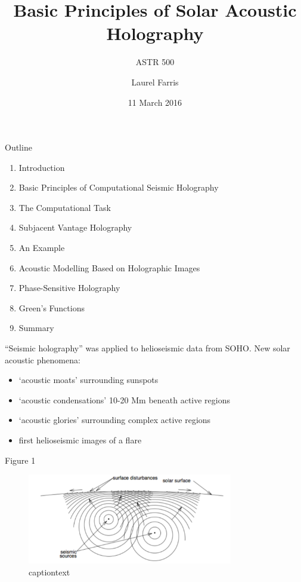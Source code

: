 \documentclass{beamer}
\title{Basic Principles of Solar Acoustic Holography}
\subtitle{ASTR 500}
\date{11 March 2016}
\author{Laurel Farris}
\begin{document}
\begin{frame}
    \titlepage
\end{frame}

\begin{frame}{Outline}
    \begin{enumerate}
        \item Introduction
        \item Basic Principles of Computational Seismic Holography
        \item The Computational Task
        \item Subjacent Vantage Holography
        \item An Example
        \item Acoustic Modelling Based on Holographic Images
        \item Phase-Sensitive Holography
        \item Green's Functions
        \item Summary
    \end{enumerate}
\end{frame}

\begin{frame}
    ``Seismic holography'' was applied to helioseismic data from SOHO.
    New solar acoustic phenomena:
    \begin{itemize}
        \item `acoustic moats' surrounding sunspots
        \item `acoustic condensations' 10-20 Mm beneath active regions
        \item `acoustic glories' surrounding complex active regions
        \item first helioseismic images of a flare
    \end{itemize}
\end{frame}

\begin{frame}{Figure 1}
    \begin{figure}
        \includegraphics[width=0.8\textwidth]{fig_1.pdf}
        \caption{captiontext}
    \end{figure}
\end{frame}
\end{document}
